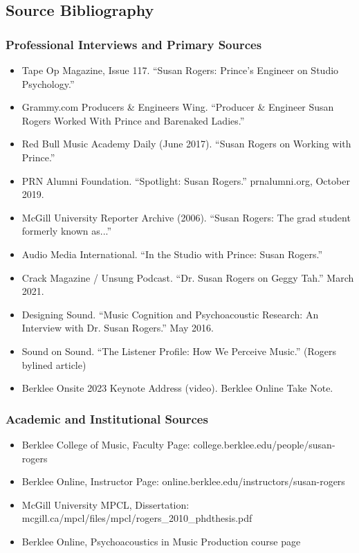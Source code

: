 \documentclass[11pt,letterpaper]{article}
\begin{document}
\subsection{Source Bibliography}

\subsubsection{Professional Interviews and Primary Sources}
\begin{itemize}[leftmargin=2em]
  \item Tape Op Magazine, Issue 117. ``Susan Rogers: Prince's Engineer on Studio Psychology.''
  \item Grammy.com Producers \& Engineers Wing. ``Producer \& Engineer Susan Rogers Worked With Prince and Barenaked Ladies.''
  \item Red Bull Music Academy Daily (June 2017). ``Susan Rogers on Working with Prince.''
  \item PRN Alumni Foundation. ``Spotlight: Susan Rogers.'' prnalumni.org, October 2019.
  \item McGill University Reporter Archive (2006). ``Susan Rogers: The grad student formerly known as...''
  \item Audio Media International. ``In the Studio with Prince: Susan Rogers.''
  \item Crack Magazine / Unsung Podcast. ``Dr. Susan Rogers on Geggy Tah.'' March 2021.
  \item Designing Sound. ``Music Cognition and Psychoacoustic Research: An Interview with Dr. Susan Rogers.'' May 2016.
  \item Sound on Sound. ``The Listener Profile: How We Perceive Music.'' (Rogers bylined article)
  \item Berklee Onsite 2023 Keynote Address (video). Berklee Online Take Note.
\end{itemize}

\subsubsection{Academic and Institutional Sources}
\begin{itemize}[leftmargin=2em]
  \item Berklee College of Music, Faculty Page: college.berklee.edu/people/susan-rogers
  \item Berklee Online, Instructor Page: online.berklee.edu/instructors/susan-rogers
  \item McGill University MPCL, Dissertation: mcgill.ca/mpcl/files/mpcl/rogers\_2010\_phdthesis.pdf
  \item Berklee Online, Psychoacoustics in Music Production course page
\end{itemize}
\end{document}
